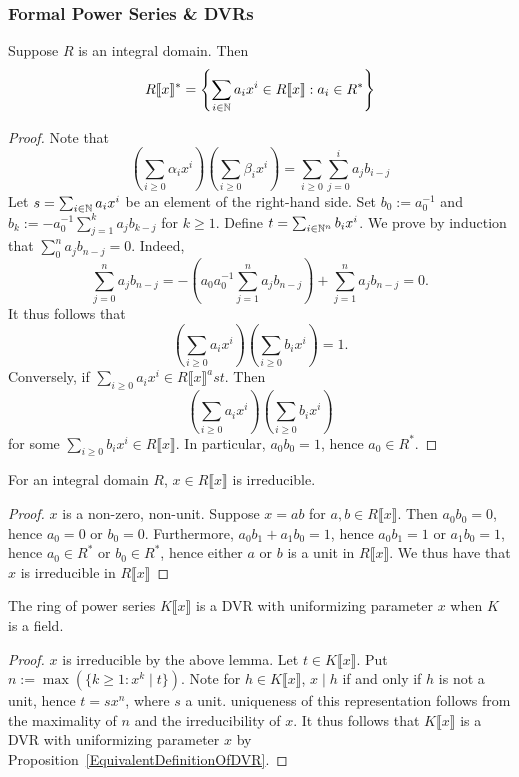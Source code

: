 \subsubsection{Formal Power Series \& DVRs}
\begin{lemma}
    Suppose $R$ is an integral domain. Then $$R\llbracket x \rrbracket ^\ast=  \left\{\sum_{i\in \mathbb{N}} a_ix^i\in R\llbracket x\rrbracket : a_i \in R^\ast \right\}$$
\end{lemma}
\begin{proof}
    Note that 
    $$
        \left(\sum_{i\geq 0} \alpha_i x^i\right)\left(\sum_{i\geq 0} \beta_i x^i \right) = \sum_{i\geq 0} \sum_{j=0}^i a_{j}b_{i-j}
    $$
    Let $s = \sum_{i\in\mathbb{N}}a_ix^i$  be an element of the right-hand side. Set $b_0 := a_0^{-1}$ and $b_k := -a_0^{-1}\sum_{j=1}^{k} a_jb_{k-j}$ for $k\geq 1$. Define $t =  \sum_{i\in \mathbb{N}^n} b_ix^i$. We prove by induction that $\sum_0^n a_jb_{n-j}=0$. Indeed, 
    $$
        \sum_{j=0}^na_jb_{n-j} = -\left(a_0a_0^{-1}\sum_{j=1}^n a_{j}b_{n-j} \right)+\sum_{j=1}^n a_jb_{n-j} =0.
    $$
    It thus follows that 
    $$
        \left(\sum_{i\geq 0} a_i x^i\right)\left(\sum_{i\geq 0} b_i x^i \right) = 1.
    $$
    Conversely, if $\sum_{i\geq 0} a_ix^i\in R\llbracket x\rrbracket^ast$. Then 
    $$
         \left(\sum_{i\geq 0} a_i x^i\right)\left(\sum_{i\geq 0} b_i x^i \right)
    $$
    for some $\sum_{i\geq 0} b_i x^i \in R\llbracket x\rrbracket$. In particular, $a_0b_0 = 1$, hence $a_0\in R^\ast$. 
\end{proof}
\begin{lemma}
    For an integral domain $R$, $x\in R\llbracket x \rrbracket$ is irreducible.  
\end{lemma}
\begin{proof}
    $x$ is a non-zero, non-unit. Suppose $x=ab$ for $a,b\in R\llbracket x\rrbracket$. Then $a_0b_0=0$, hence $a_0=0$ or $b_0 =0$. Furthermore, $a_0b_1+a_1b_0 = 1$, hence $a_0b_1=1$ or $a_1b_0 = 1$, hence $a_0\in R^\ast$ or $b_0\in R^\ast$, hence either $a$ or $b$ is a unit in $R\llbracket x\rrbracket$. We thus have that $x$ is irreducible in $R\llbracket x\rrbracket$    
\end{proof}
\begin{proposition}
    The ring of power series $K\llbracket x\rrbracket$ is a DVR with uniformizing parameter $x$ when $K$ is a field.
\end{proposition}
\begin{proof}
    $x$ is irreducible by the above lemma. Let $t\in K\llbracket x\rrbracket$. Put\\ $n := \max (\{k\geq 1: x^k\mid t\}).$ Note for $h\in K\llbracket x\rrbracket$, $x\mid h $ if and only if $h$ is not a unit, hence $t = sx^n$, where $s$ a unit. uniqueness of this representation follows from the maximality of $n$ and the irreducibility of $x$. It thus follows that $K\llbracket x\rrbracket$ is a DVR with uniformizing parameter $x$ by Proposition~\ref{EquivalentDefinitionOfDVR}.
\end{proof}
